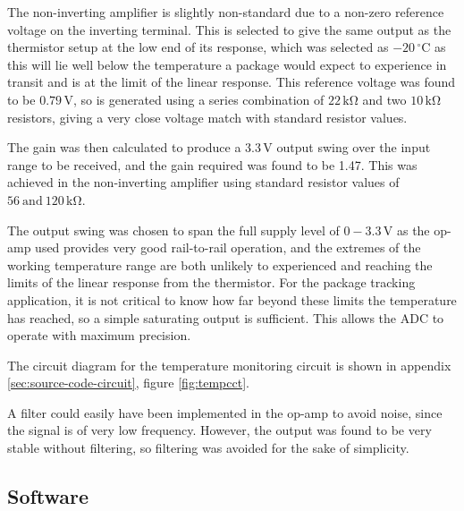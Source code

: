 \documentclass[a4paper,10pt]{article}  %
\providecommand{\degrees}{\ensuremath{^{\circ}}}
\begin{document}
The non-inverting amplifier is slightly non-standard due to a non-zero
reference voltage on the inverting terminal. This is selected to give
the same output as the thermistor setup at the low end of its
response, which was selected as $-20\,\mathrm{\degrees C}$ as this
will lie well below the temperature a package would expect to
experience in transit and is at the limit of the linear response. This
reference voltage was found to be $0.79\,\mathrm{V}$, so is generated
using a series combination of $22\,\mathrm{k \Omega}$ and two
$10\,\mathrm{k \Omega}$ resistors, giving a very close voltage match
with standard resistor values.

The gain was then calculated to produce a $3.3\,\mathrm{V}$ output
swing over the input range to be received, and the gain required was
found to be 1.47. This was achieved in the non-inverting amplifier
using standard resistor values of $56\ \mathrm{and}\ 120\,\mathrm{k
  \Omega}$.

The output swing was chosen to span the full supply level of
$0-3.3\,\mathrm{V}$ as the op-amp used provides very good rail-to-rail
operation, and the extremes of the working temperature range are both
unlikely to experienced and reaching the limits of the linear response
from the thermistor. For the package tracking application, it is not
critical to know how far beyond these limits the temperature has
reached, so a simple saturating output is sufficient. This allows the
ADC to operate with maximum precision.

The circuit diagram for the temperature monitoring circuit is shown in
appendix \ref{sec:source-code-circuit}, figure \ref{fig:tempcct}.

A filter could easily have been implemented in the op-amp to avoid
noise, since the signal is of very low frequency. However, the output
was found to be very stable without filtering, so filtering was
avoided for the sake of simplicity.

\subsection{Software}
\label{sec:software}
\end{document}
